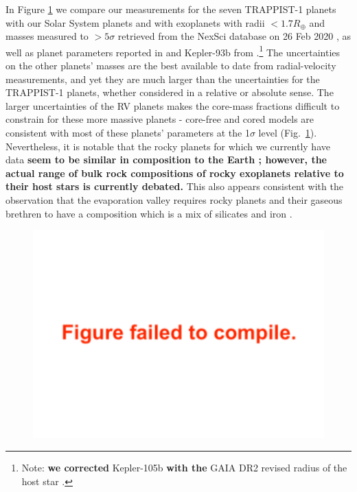 \documentclass[twocolumn]{aastex63}
\begin{document}
In Figure \ref{fig:mass_radius_comparison} we compare our measurements for
the seven TRAPPIST-1 planets with our Solar System planets and with exoplanets
with radii ${<}1.7 R_\oplus$ and masses measured to ${>}5\sigma$ retrieved from
the NexSci database on 26 Feb 2020 \citep{Akeson2013,Christiansen2018}, as well
as planet parameters reported in \citet{Dai2019} and Kepler-93b from \citet{Dressing2015}.\footnote{Note: \textbf{we corrected} Kepler-105b \textbf{with the} GAIA DR2 revised radius of
    the host star \citep{Berger2018,Fulton2018}.}   The uncertainties
on the other planets' masses are the best available to date from radial-velocity measurements, and yet they are much larger than the uncertainties for the TRAPPIST-1 planets, whether considered in
a relative or absolute sense.  The larger uncertainties of the RV planets makes the core-mass fractions difficult to constrain
for these more massive planets - core-free and cored models are consistent with most of these planets' parameters at the 1$\sigma$ level (Fig.\ \ref{fig:mass_radius_comparison}).   Nevertheless, it is notable that the
rocky planets for which we currently have data \textbf{seem to be similar in composition to the
Earth \citep{Dressing2015}; however, the actual range of bulk rock compositions of rocky exoplanets relative to their host stars is currently debated.}
This also appears consistent with the observation
that the evaporation valley requires rocky planets and their gaseous brethren to have
a composition which is a mix of silicates and iron \citep{Owen2017}.

\begin{figure}
    \centering
    \includegraphics[width = \hsize]{figures/mass_radius_relation_comparison.pdf}
    \label{fig:mass_radius_comparison}
\end{figure}
\end{document}
